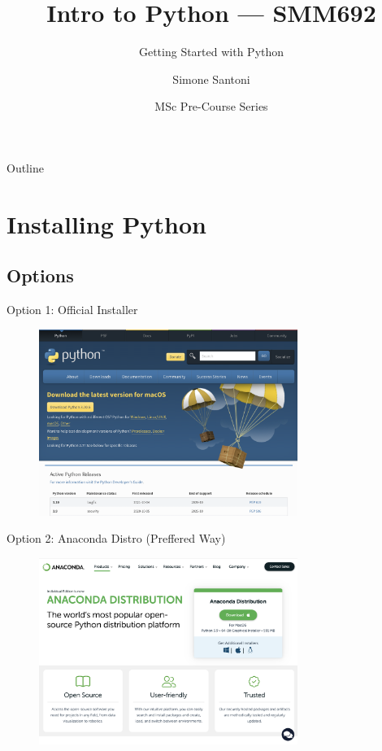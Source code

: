 \documentclass[aspectratio=1610]{beamer}
\title{Intro to Python --- SMM692}
\subtitle{Getting Started with Python}
\author{Simone Santoni}
\institute{Bayes Business School}
\date{MSc Pre-Course Series}
\begin{document}
\begin{frame}
	\titlepage
\end{frame}

\begin{frame}{Outline}
	\tableofcontents
\end{frame}


\section{Installing Python}

\subsection{Options}

\begin{frame}[c]{Option 1: Official Installer}
	\begin{figure}
		\includegraphics[width=0.75\textwidth]{images/official_installer.png}
	\end{figure}
\end{frame}

\begin{frame}[c]{Option 2: Anaconda Distro (Preffered Way)}
	\begin{figure}
		\includegraphics[width=0.75\textwidth]{images/anaconda_distro.png}
	\end{figure}
\end{frame}
\end{document}
